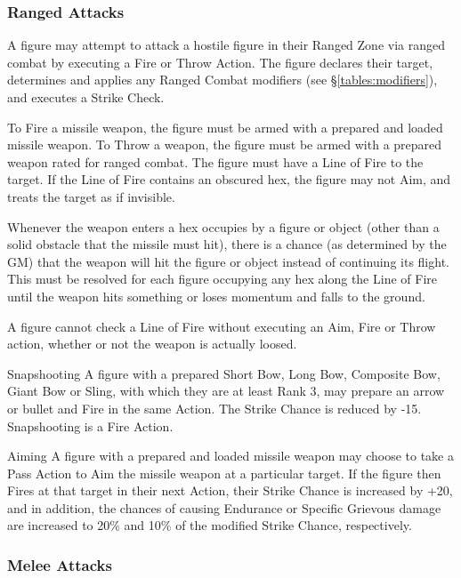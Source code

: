 \begin{multicols*}{3}
\subsubsection{Ranged Attacks}

A figure may attempt to attack a hostile figure in their Ranged Zone
via ranged combat by executing a Fire or Throw Action. The figure
declares their target, determines and applies any Ranged Combat
modifiers (see \S \ref{tables:modifiers}), and executes a Strike
Check.

To Fire a missile weapon, the figure must be armed with a prepared and
loaded missile weapon. To Throw a weapon, the figure must be armed
with a prepared weapon rated for ranged combat. The figure must have a
Line of Fire to the target. If the Line of Fire contains an obscured
hex, the figure may not Aim, and treats the target as if invisible.

Whenever the weapon enters a hex occupies by a figure or object (other
than a solid obstacle that the missile must hit), there is a chance
(as determined by the GM) that the weapon will hit the figure or
object instead of continuing its flight. This must be resolved for
each figure occupying any hex along the Line of Fire until the weapon
hits something or loses momentum and falls to the ground.

A figure cannot check a Line of Fire without executing an Aim, Fire or
Throw action, whether or not the weapon is actually loosed.

\begin{Description}
\item[Snapshooting] A figure with a prepared Short Bow, Long Bow,
Composite Bow, Giant Bow or Sling, with which they are at least Rank
3, may prepare an arrow or bullet and Fire in the same Action. The
Strike Chance is reduced by -15. Snapshooting is a Fire Action.

\item[Aiming] A figure with a prepared and loaded missile weapon may
choose to take a Pass Action to Aim the missile weapon at a particular
target. If the figure then Fires at that target in their next Action,
their Strike Chance is increased by +20, and in addition, the chances
of causing Endurance or Specific Grievous damage are increased to 20\%
and 10\% of the modified Strike Chance, respectively.
\end{Description}

\subsubsection{Melee Attacks}


\end{multicols*}

